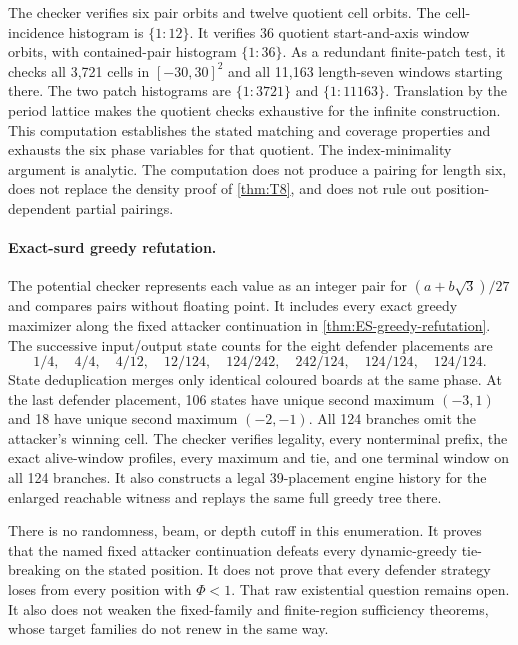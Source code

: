 The checker verifies six pair orbits and twelve quotient cell orbits.  The
cell-incidence histogram is $\{1:12\}$.  It verifies 36 quotient
start-and-axis window orbits, with contained-pair histogram $\{1:36\}$.
As a redundant finite-patch test, it checks all 3,721 cells in
$[-30,30]^2$ and all 11,163 length-seven windows starting there.  The two
patch histograms are $\{1:3721\}$ and $\{1:11163\}$.  Translation by the
period lattice makes the quotient checks exhaustive for the infinite
construction.  This computation establishes the stated matching and
coverage properties and exhausts the six phase variables for that quotient.
The index-minimality argument is analytic.  The computation does not produce
a pairing for length six, does not replace the density proof of
\cref{thm:T8}, and does not rule out position-dependent partial pairings.

\paragraph{Exact-surd greedy refutation.}
The potential checker represents each value as an integer pair for
$(a+b\sqrt3)/27$ and compares pairs without floating point.  It includes
every exact greedy maximizer along the fixed attacker continuation in
\cref{thm:ES-greedy-refutation}.  The successive input/output state counts
for the eight defender placements are
\[
  1/4,\quad 4/4,\quad 4/12,\quad 12/124,\quad
  124/242,\quad 242/124,\quad 124/124,\quad 124/124.
\]
State deduplication merges only identical coloured boards at the same phase.
At the last defender placement, 106 states have unique second maximum
$(-3,1)$ and 18 have unique second maximum $(-2,-1)$.  All 124 branches omit
the attacker's winning cell.  The checker verifies legality, every
nonterminal prefix, the exact alive-window profiles, every maximum and tie,
and one terminal window on all 124 branches.  It also constructs a legal
39-placement engine history for the enlarged reachable witness and replays
the same full greedy tree there.

There is no randomness, beam, or depth cutoff in this enumeration.  It proves
that the named fixed attacker continuation defeats every dynamic-greedy
tie-breaking on the stated position.  It does not prove that every defender
strategy loses from every position with $\Phi<1$.  That raw existential
question remains open.  It also does not weaken the fixed-family and
finite-region sufficiency theorems, whose target families do not renew in the
same way.

